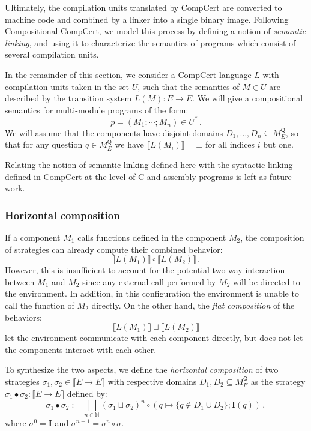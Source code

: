 \documentclass[format=sigplan,authordraft]{acmart}
\newcommand{\kw}[1]{\ensuremath{\mathsf{#1}}}
\begin{document}
Ultimately,
the compilation units translated by CompCert
are converted to machine code
and combined by a linker into a single
binary image.
Following Compositional CompCert,
we model this process by defining a notion of
\emph{semantic linking},
and using it to characterize the semantics
of programs which consist of several compilation units.

In the remainder of this section,
we consider a CompCert language $L$
with compilation units taken in the set $U$,
such that the semantics of $M \in U$
are described by the transition system $L(M) : E \rightarrow E$.
We will give a compositional semantics
for multi-module programs of the form:
\[
    p = (M_1; \cdots; M_n) \in U^* \,.
\]
We will assume that the components have disjoint domains
$D_1, \ldots, D_n \subseteq M_E^\kw{Q}$,
so that for any question $q \in M_E^\kw{Q}$
we have $\llbracket L(M_i) \rrbracket = \bot$
for all indices $i$ but one.

Relating the notion of semantic linking defined here
with the syntactic linking defined in CompCert
at the level of C and assembly programs
is left as future work.

\subsubsection{Horizontal composition}

If a component $M_1$ calls functions defined
in the component $M_2$,
the composition of strategies
can already compute their combined behavior:
\[
    \llbracket L(M_1) \rrbracket \circ
    \llbracket L(M_2) \rrbracket \,.
\]
However,
this is insufficient to account for
the potential two-way interaction between $M_1$ and $M_2$
since any external call performed by $M_2$
will be directed to the environment.
In addition,
in this configuration the environment
is unable to call the function of $M_2$ directly.
On the other hand,
the \emph{flat composition} of the behaviors:
\[
    \llbracket L(M_1) \rrbracket \sqcup
    \llbracket L(M_2) \rrbracket
\]
let the environment communicate with each component directly,
but does not let the components interact with each other.

To synthesize the two aspects,
we define the \emph{horizontal composition}
of two strategies $\sigma_1, \sigma_2 \in \llbracket E \rightarrow E \rrbracket$
with respective domains $D_1, D_2 \subseteq M_E^\kw{Q}$
as the strategy $\sigma_1 \bullet \sigma_2 : \llbracket E \rightarrow E
\rrbracket$ defined by:
\[
    \sigma_1 \bullet \sigma_2 :=
      \bigsqcup_{n \in \mathbb{N}} (\sigma_1 \sqcup \sigma_2)^n \circ
        (q \mapsto \{ q \notin D_1 \cup D_2 \} ; \mathbf{I}(q))
 \,,
\]
where $\sigma^0 = \mathbf{I}$ and $\sigma^{n+1} = \sigma^n \circ
\sigma$.
\end{document}
